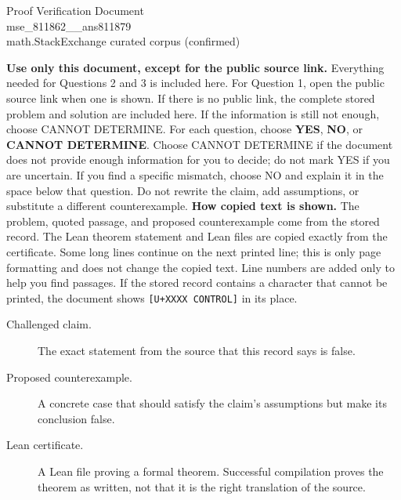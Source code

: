 \documentclass[11pt]{article}
\begin{document}
\begin{center}{\LARGE Proof Verification Document}\\[2pt]{\large mse\_811862\_\_ans811879}\\[2pt]{\small math.StackExchange curated corpus (confirmed)}\end{center}
\begin{center}\end{center}
\textbf{Use only this document, except for the public source link.} Everything needed for Questions 2 and 3 is included here. For Question 1, open the public source link when one is shown. If there is no public link, the complete stored problem and solution are included here. If the information is still not enough, choose CANNOT DETERMINE.
For each question, choose \textbf{YES}, \textbf{NO}, or \textbf{CANNOT DETERMINE}. Choose CANNOT DETERMINE if the document does not provide enough information for you to decide; do not mark YES if you are uncertain. If you find a specific mismatch, choose NO and explain it in the space below that question. Do not rewrite the claim, add assumptions, or substitute a different counterexample.
\textbf{How copied text is shown.} The problem, quoted passage, and proposed counterexample come from the stored record. The Lean theorem statement and Lean files are copied exactly from the certificate. Some long lines continue on the next printed line; this is only page formatting and does not change the copied text. Line numbers are added only to help you find passages. If the stored record contains a character that cannot be printed, the document shows \texttt{[U+XXXX CONTROL]} in its place.
\begin{description}
\item[Challenged claim.] The exact statement from the source that this record says is false.
\item[Proposed counterexample.] A concrete case that should satisfy the claim's assumptions but make its conclusion false.
\item[Lean certificate.] A Lean file proving a formal theorem. Successful compilation proves the theorem as written, not that it is the right translation of the source.
\end{description}
\end{document}
